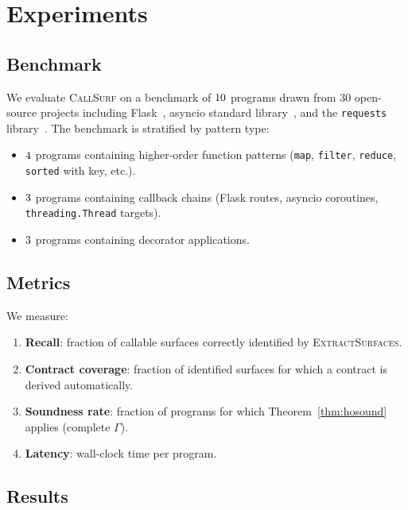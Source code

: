 \documentclass[11pt]{article}
\newcommand{\CEnv}{\Gamma}                     %
\newcommand{\MapF}{\texttt{map}}               %
\newcommand{\FilterF}{\texttt{filter}}         %
\newcommand{\ReduceF}{\texttt{reduce}}         %
\newcommand{\CallSurf}{\textsc{CallSurf}}      %
\begin{document}
\section{Experiments}\label{sec:experiments}

\subsection{Benchmark}

We evaluate \CallSurf{} on a benchmark of $10{}$ \Python{}
programs drawn from $30$ open-source projects including
Flask~\cite{flask}, asyncio standard library~\cite{asyncio}, and the
\texttt{requests} library~\cite{requests}.  The benchmark is stratified
by pattern type:
\begin{itemize}
  \item $4{}$ programs containing higher-order function patterns
        (\MapF, \FilterF, \ReduceF, \texttt{sorted} with key, etc.).
  \item $3{}$ programs containing callback chains (Flask routes,
        asyncio coroutines, \texttt{threading.Thread} targets).
  \item $3{}$ programs containing
        decorator applications.
\end{itemize}

\subsection{Metrics}

We measure:
\begin{enumerate}
  \item \textbf{Recall}: fraction of callable surfaces correctly
        identified by \textsc{ExtractSurfaces}.
  \item \textbf{Contract coverage}: fraction of identified surfaces
        for which a contract is derived automatically.
  \item \textbf{Soundness rate}: fraction of programs for which
        Theorem~\ref{thm:hosound} applies (complete $\CEnv$).
  \item \textbf{Latency}: wall-clock time per program.
\end{enumerate}

\subsection{Results}
\end{document}
